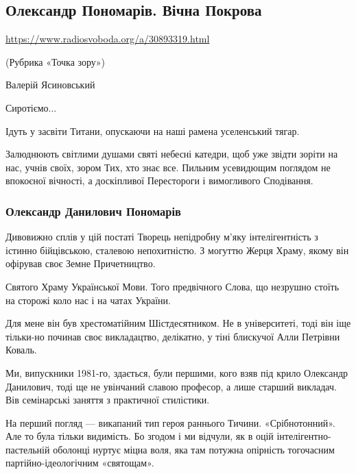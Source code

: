  
 

\subsection{Олександр Пономарів. Вічна Покрова}
\label{sec:15_10_2020.news.ua.radio_svoboda.1_ponomariv}

\url{https://www.radiosvoboda.org/a/30893319.html}

(Рубрика «Точка зору»)

Валерій Ясиновський

Сиротіємо...

Ідуть у засвіти Титани, опускаючи на наші рамена уселенський тягар.

Залюднюють світлими душами святі небесні катедри, щоб уже звідти зоріти на нас,
учнів своїх, зором Тих, хто знає все. Пильним усевидющим поглядом не впокоєної
вічності, а доскіпливої Перестороги і вимогливого Сподівання.

\subsubsection{Олександр Данилович Пономарів}

Дивовижно сплів у цій постаті Творець непідробну м'яку інтелігентність з
істинно бійцівською, сталевою непохитністю. З могуттю Жерця Храму, якому він
офірував своє Земне Причетництво.

Святого Храму Української Мови. Того предвічного Слова, що незрушно стоїть на
сторожі коло нас і на чатах України. 

Для мене він був хрестоматійним Шістдесятником. Не в університеті, тоді він іще
тільки-но починав своє викладацтво, делікатно, у тіні блискучої Алли Петрівни
Коваль.

Ми, випускники 1981-го, здається, були першими, кого взяв під крило Олександр
Данилович, тоді ще не увінчаний славою професор, а лише старший викладач. Вів
семінарські заняття з практичної стилістики.

На перший погляд --- викапаний тип героя раннього Тичини. «Срібнотонний». Але то
була тільки видимість. Бо згодом і ми відчули, як в оцій
інтелігентно-пастельній оболонці нуртує міцна воля, яка там потужна опірність
тогочасним партійно-ідеологічним «святощам».

